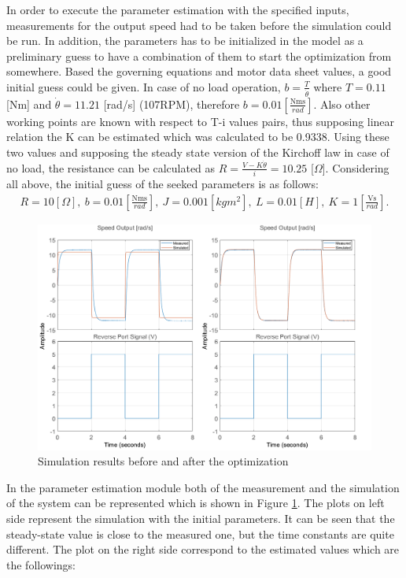 \documentclass[12pt,english,twoside]{article}
\begin{document}
In order to execute the parameter estimation with the specified inputs, measurements for the output speed had to be taken before the simulation could be run. In addition, the parameters has to be initialized in the model as a preliminary guess to have a combination of them to start the optimization from somewhere. Based the governing equations and motor data sheet values, a good initial guess could be given. In case of no load operation, $b=\frac{T}{\dot \theta}$ where $T=0.11$ [Nm] and $\dot \theta =11.21$ [rad/s] (107RPM), therefore $b=0.01[\frac{\text{Nms}}{rad}]$. Also other working points are known with respect to T-i values pairs, thus supposing linear relation the K can be estimated which was calculated to be 0.9338. Using these two values and supposing the steady state version of the Kirchoff law in case of no load, the resistance can be calculated as $R=\frac{V-K \dot \theta}{i} = 10.25$ [$\Omega$].
Considering all above, the initial guess of the seeked parameters is as follows:
\begin{equation}
\begin{split}
R=10[\Omega],~b=0.01[\frac{\text{Nms}}{rad}],~J=0.001[kgm^2],~L=0.01[H],~K=1[\frac{\text{Vs}}{rad}].
\end{split}
\end{equation}
\begin{figure}[htb!]
	\centering
	\includegraphics[width=\textwidth]{figures/simulink_par_est_1.png}
	\caption{Simulation results before and after the optimization}
	\label{simulink_par_est_1}
\end{figure}
 In the parameter estimation module both of the measurement and the simulation of the system can be represented which is shown in Figure \ref{simulink_par_est_1}. The plots on left side represent the simulation with the initial parameters. It can be seen that the steady-state value is close to the measured one, but the time constants are quite different. The plot on the right side correspond to the estimated values which are the followings:
\end{document}
